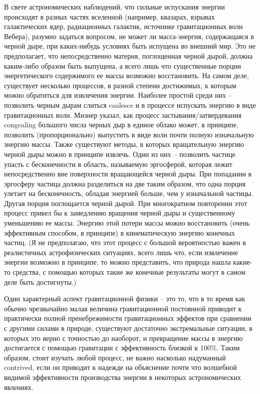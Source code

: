 \documentclass[a4paper, 10pt, twocolumn]{article}
\def\q#1{{\color{red} #1}}
\begin{document}
В свете астрономических наблюдений, что сильные испускания энергии 
происходят в разных частях вселенной (например, квазарах, взрывах 
галактических ядер, радиационных галактик, источнике гравитационных волн 
Вебера), разумно задаться вопросом, не может ли масса-энергия, 
содержащаяся в черной дыре, при каких-нибудь условиях быть испущена во 
внешний мир. Это не предполагает, что непосредственно материя, 
поглощенная черной дырой, должна каким-либо образом быть выпущена, 
а всего лишь что существенные порции энергетического содержимого ее 
массы возможно восстановить. На самом деле, существует несколько 
процессов, в разной степени достижимых, к которым можно обратиться для 
извлечения энергии. Наиболее простой среди них -- позволить черным дырам 
слиться \q{coalesce} и в процессе испускать энергию в виде 
гравитационных волн. Мизнер указал, как процесс застывания/затвердевания 
\q{congealing} большого числа черных дыр в единое облако может, 
в принципе, позволить (пропорционально) выпустить в виде волн почти 
полную изначальную энергию массы. Также существуют методы, в которых 
вращательную энергию черной дыры можно в принципе извлечь. Один из них 
-- позволить частице упасть с бесконечности в область, называемую 
эргосферой, которая лежит непосредственно вне поверхности вращающейся 
черной дыры. При попадании в эргосферу частица должна разделиться на две 
таким образом, что одна порция улетает на бесконечность, обладая 
энергией больше, чем у изначальной частицы. Другая порция поглощается 
черной дырой. При многократном повторении этот процесс привел бы 
к замедлению вращения черной дыры и существенному уменьшению ее массы. 
Энергию этой потери массы можно восстановить (очень эффективным 
способом, в принципе) в кинематическую энергию конечных частиц. (Я не 
предполагаю, что этот процесс с большой вероятностью важен 
в реалистичных астрофизических ситуациях, всего лишь что, если 
извлечение энергии возможно в принципе, то можно представить, что 
природа нашла какие-то средства, с помощью которых такие же конечные 
результаты могут в самом деле быть достигнуты.)

Один характерный аспект гравитационной физики -- это то, что в то время 
как обычно чрезвычайно малая величина гравитационной постоянной приводит 
к практически полной пренебрежимости гравитационных эффектов при 
сравнении с другими силами в природе, существуют достаточно 
экстремальные ситуации, в которых это верно с точностью до наоборот, 
и превращение массы в энергию достигается с помощью гравитации 
с эффективность близкой к 100\%. Таким образом, стоит изучать любой 
процесс, не важно насколько надуманный \q{contrived}, если он приводит 
к надежде на объяснение почти что волшебной видимой эффективности 
производства энергии в некоторых астрономических явлениях.
\end{document}
